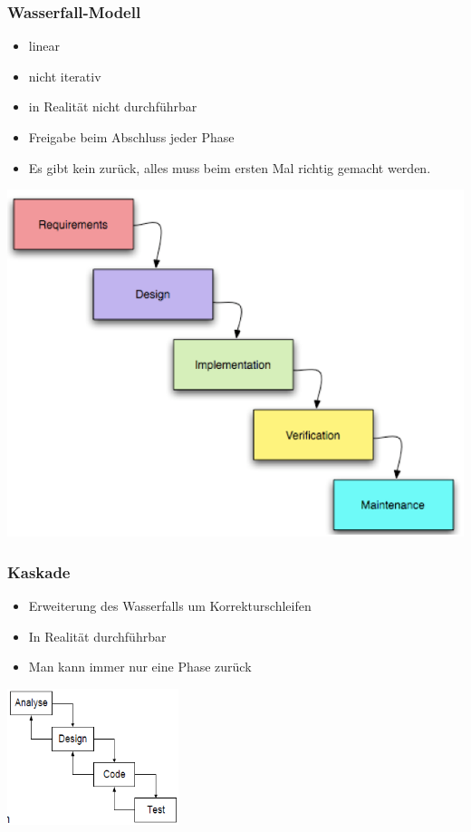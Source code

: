 \subsubsection{Wasserfall-Modell}
\begin{minipage}{10cm}
	\begin{itemize}
		\item linear
		\item nicht iterativ
		\item in Realität nicht durchführbar
		\item Freigabe beim Abschluss jeder Phase
		\item Es gibt kein zurück, alles muss beim ersten Mal richtig gemacht werden. 
	\end{itemize}
\end{minipage}
\begin{minipage}{5cm}
	\includegraphics[width=5
	cm]{images/wasserfall_modell.png}
\end{minipage}
	
\subsubsection{Kaskade}
	\begin{minipage}{10cm}
		\begin{itemize}
			\item Erweiterung des Wasserfalls um Korrekturschleifen
			\item In Realität durchführbar
			\item Man kann immer nur eine Phase zurück
		\end{itemize}
	\end{minipage}
	\begin{minipage}{5cm}
	\includegraphics[width=5cm]{images/kaskade.png}	
	\end{minipage}

